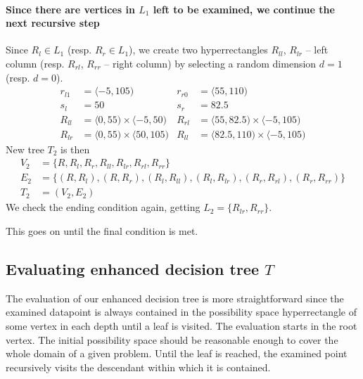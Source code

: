 \begin{example}
    \paragraph{Since there are vertices in $L_1$ left to be examined, we continue the next recursive step}
    Since $R_l \in L_1$ (resp. $R_r \in L_1$), we create two hyperrectangles $R_{ll}$, $R_{lr}$ -- left column (resp. $R_{rl}$, $R_{rr}$ -- right column) by selecting a random dimension $d=1$ (resp. $d=0$).
    \begin{align*}
        r_{l1} &= \langle -5, 105)& r_{r0} &= \langle 55, 110) \\
        s_l &= 50 & s_r&=82.5\\
        R_{ll} &= \langle 0, 55) \times \langle -5,50) & R_{rl} &= \langle 55, 82.5) \times \langle -5,105)\\
        R_{lr} &= \langle 0, 55) \times \langle 50,105) & R_{ll} &= \langle 82.5, 110) \times \langle -5,105)
    \end{align*}
 New tree $T_2$ is then
    \begin{align*}
        V_2 &= \{R, R_l, R_r, R_{ll}, R_{lr}, R_{rl}, R_{rr}\} \\
        E_2 &= \{(R, R_l), (R, R_r), (R_l, R_{ll}), (R_l, R_{lr}), (R_r, R_{rl}), (R_r, R_{rr})\} \\
        T_2 &= (V_2, E_2)
    \end{align*}
 We check the ending condition again, getting $L_2 = \{R_{lr}, R_{rr}\}$.

    This goes on until the final condition is met.
\end{example}

\subsection{Evaluating enhanced decision tree $T$}
The evaluation of our enhanced decision tree is more straightforward since the examined datapoint is always contained in the possibility space hyperrectangle of some vertex in each depth until a leaf is visited.
The evaluation starts in the root vertex. The initial possibility space should be reasonable enough to cover the whole domain of a given problem. Until the leaf is reached, the examined point recursively visits the descendant within which it is contained.



